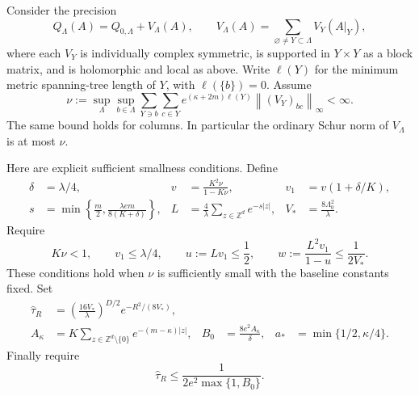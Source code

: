 \documentclass[11pt]{article}
\newcommand{\Z}{\mathbb Z}
\newcommand{\norm}[1]{\left\|#1\right\|}
\begin{document}
Consider the precision
\begin{equation}
 Q_\Lambda(A)=Q_{0,\Lambda}+V_\Lambda(A),\qquad
 V_\Lambda(A)=\sum_{\varnothing\ne Y\subset\Lambda}V_Y(A|_Y),
 \label{eq:precision}
\end{equation}
where each $V_Y$ is individually complex symmetric, is supported in
$Y\times Y$ as a block matrix, and is holomorphic and local as above.
Write $\ell(Y)$ for the minimum metric spanning-tree length of $Y$,
with $\ell(\{b\})=0$. Assume
\begin{equation}
 \nu:=\sup_\Lambda\sup_{b\in\Lambda}
       \sum_{Y\ni b}\sum_{c\in Y}
       e^{(\kappa+2m)\ell(Y)}\norm{(V_Y)_{bc}}_\infty
       <\infty.
 \label{eq:local-norm}
\end{equation}
The same bound holds for columns. In particular the ordinary Schur norm
of $V_\Lambda$ is at most $\nu$.

Here are explicit sufficient smallness conditions. Define
\begin{align}
 \delta&=\lambda/4,&
 v&=\frac{K^2\nu}{1-K\nu},&
 v_1&=v(1+\delta/K),                                      \label{eq:vconstants}\\
 s&=\min\left\{\frac m2,\frac{\lambda e m}{8(K+\delta)}\right\},&
 L&=\frac4\lambda\sum_{z\in\Z^d}e^{-s|z|},&
 V_*&=\frac{8\Lambda_0^2}{\lambda}.                       \label{eq:inverseconstants}
\end{align}
Require
\begin{equation}
 K\nu<1,\qquad v_1\le\lambda/4,\qquad
 u:=Lv_1\le\frac12,\qquad
 w:=\frac{L^2v_1}{1-u}\le\frac1{2V_*}.
 \label{eq:smallness}
\end{equation}
These conditions hold when $\nu$ is sufficiently small with the baseline
constants fixed. Set
\begin{align}
 \widehat\tau_R
   &=\left(\frac{16V_*}{\lambda}\right)^{D/2}
                         e^{-R^2/(8V_*)},                 \label{eq:tau}\\
 A_\kappa
   &=K\sum_{z\in\Z^d\setminus\{0\}}e^{-(m-\kappa)|z|},
 &B_0&=\frac{8e^2A_\kappa}{\delta},
 &a_*&=\min\{1/2,\kappa/4\}.                              \label{eq:clusterconstants}
\end{align}
Finally require
\begin{equation}
 \widehat\tau_R\le\frac1{2e^2\max\{1,B_0\}}.
 \label{eq:cutoff-smallness}
\end{equation}
\end{document}
